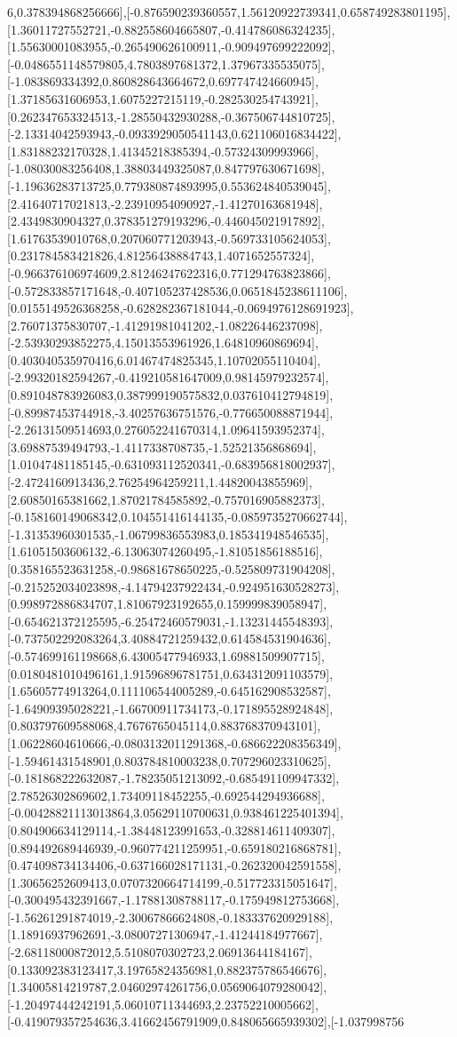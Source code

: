 \documentclass{article}
\begin{document}
6,0.378394868256666],[-0.876590239360557,1.56120922739341,0.658749283801195],[1.36011727552721,-0.882558604665807,-0.414786086324235],[1.55630001083955,-0.265490626100911,-0.909497699222092],[-0.0486551148579805,4.7803897681372,1.37967335535075],[-1.083869334392,0.860828643664672,0.697747424660945],[1.37185631606953,1.6075227215119,-0.282530254743921],[0.262347653324513,-1.28550432930288,-0.367506744810725],[-2.13314042593943,-0.0933929050541143,0.621106016834422],[1.83188232170328,1.41345218385394,-0.57324309993966],[-1.08030083256408,1.38803449325087,0.847797630671698],[-1.19636283713725,0.779380874893995,0.553624840539045],[2.41640717021813,-2.23910954090927,-1.41270163681948],[2.4349830904327,0.378351279193296,-0.446045021917892],[1.61763539010768,0.207060771203943,-0.569733105624053],[0.231784583421826,4.81256438884743,1.4071652557324],[-0.966376106974609,2.81246247622316,0.771294763823866],[-0.572833857171648,-0.407105237428536,0.0651845238611106],[0.0155149526368258,-0.628282367181044,-0.0694976128691923],[2.76071375830707,-1.41291981041202,-1.08226446237098],[-2.53930293852275,4.15013553961926,1.64810960869694],[0.403040535970416,6.01467474825345,1.10702055110404],[-2.99320182594267,-0.419210581647009,0.98145979232574],[0.891048783926083,0.387999190575832,0.037610412794819],[-0.89987453744918,-3.40257636751576,-0.776650088871944],[-2.26131509514693,0.276052241670314,1.09641593952374],[3.69887539494793,-1.4117338708735,-1.52521356868694],[1.01047481185145,-0.631093112520341,-0.683956818002937],[-2.4724160913436,2.76254964259211,1.44820043855969],[2.60850165381662,1.87021784585892,-0.757016905882373],[-0.158160149068342,0.104551416144135,-0.0859735270662744],[-1.31353960301535,-1.06799836553983,0.185341948546535],[1.61051503606132,-6.13063074260495,-1.81051856188516],[0.358165523631258,-0.98681678650225,-0.525809731904208],[-0.215252034023898,-4.14794237922434,-0.924951630528273],[0.998972886834707,1.81067923192655,0.159999839058947],[-0.654621372125595,-6.25472460579031,-1.13231445548393],[-0.737502292083264,3.40884721259432,0.614584531904636],[-0.574699161198668,6.43005477946933,1.69881509907715],[0.0180481010496161,1.91596896781751,0.634312091103579],[1.65605774913264,0.111106544005289,-0.645162908532587],[-1.64909395028221,-1.66700911734173,-0.171895528924848],[0.803797609588068,4.7676765045114,0.883768370943101],[1.06228604610666,-0.0803132011291368,-0.686622208356349],[-1.59461431548901,0.803784810003238,0.707296023310625],[-0.181868222632087,-1.78235051213092,-0.685491109947332],[2.78526302869602,1.73409118452255,-0.692544294936688],[-0.00428821113013864,3.05629110700631,0.938461225401394],[0.804906634129114,-1.38448123991653,-0.328814611409307],[0.894492689446939,-0.960774211259951,-0.659180216868781],[0.474098734134406,-0.637166028171131,-0.262320042591558],[1.30656252609413,0.0707320664714199,-0.517723315051647],[-0.300495432391667,-1.17881308788117,-0.175949812753668],[-1.56261291874019,-2.30067866624808,-0.183337620929188],[1.18916937962691,-3.08007271306947,-1.41244184977667],[-2.68118000872012,5.5108070302723,2.06913644184167],[0.133092383123417,3.19765824356981,0.882375786546676],[1.34005814219787,2.04602974261756,0.0569064079280042],[-1.20497444242191,5.06010711344693,2.23752210005662],[-0.419079357254636,3.41662456791909,0.848065665939302],[-1.037998756
\end{document}
